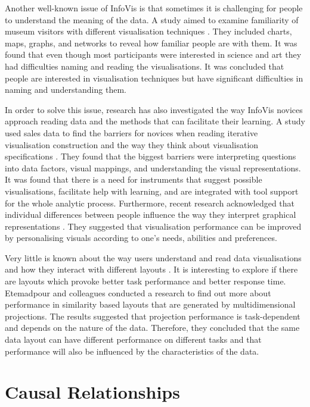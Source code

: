 \documentclass{l4proj}
\begin{document}
Another well-known issue of InfoVis is that sometimes it is challenging for people to understand the meaning of the data. A study aimed to examine familiarity of museum visitors with different visualisation techniques \cite{borner2015investigating}. They included charts, maps, graphs, and networks to reveal how familiar people are with them. It was found that even though most participants were interested in science and art they had difficulties naming and reading the visualisations. It was concluded that people are interested in visualisation techniques but have significant difficulties in naming and understanding them. 

In order to solve this issue, research has also investigated the way InfoVis novices approach reading data and the methods that can facilitate their learning. A study used sales data to find the barriers for novices when reading iterative visualisation construction and the way they think about visualisation specifications \cite{grammel2010information}. They found that the biggest barriers were interpreting questions into data factors, visual mappings, and understanding the visual representations. It was found that there is a need for instruments that suggest possible visualisations, facilitate help with learning, and are integrated with tool support for the whole analytic process. Furthermore, recent research acknowledged that individual differences between people influence the way they interpret graphical representations \cite{Steichen:2013:UIV:2449396.2449439}. They suggested that visualisation performance can be improved by personalising visuals according to one's needs, abilities and preferences.

Very little is known about the way users understand and read data visualisations and how they interact with different layouts \cite{etemadpour2015perception}. It is interesting to explore if there are layouts which provoke better task performance and better response time. Etemadpour and colleagues \cite{etemadpour2015perception} conducted a research to find out more about performance in similarity based layouts that are generated by multidimensional projections. The results suggested that projection performance is task-dependent and depends on the nature of the data. Therefore, they concluded that the same data layout can have different performance on different tasks and that performance will also be influenced by the characteristics of the data.

\section{Causal Relationships}
\end{document}
